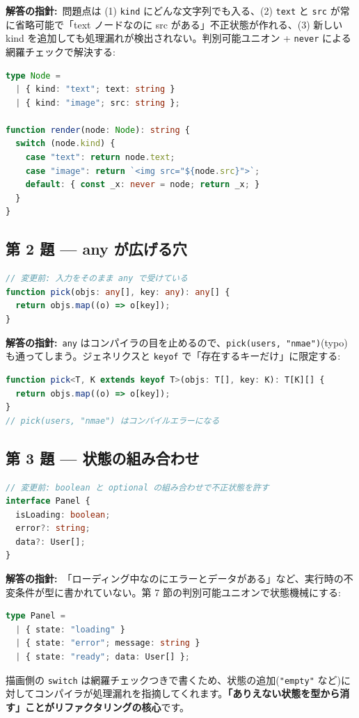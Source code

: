 \documentclass{article}
\begin{document}
\textbf{解答の指針:}\ 問題点は (1) \texttt{kind} にどんな文字列でも入る、(2) \texttt{text} と \texttt{src} が常に省略可能で「text ノードなのに src がある」不正状態が作れる、(3) 新しい kind を追加しても処理漏れが検出されない。判別可能ユニオン + \texttt{never} による網羅チェックで解決する:
\begin{lstlisting}[language=TypeScript]
type Node =
  | { kind: "text"; text: string }
  | { kind: "image"; src: string };

function render(node: Node): string {
  switch (node.kind) {
    case "text": return node.text;
    case "image": return `<img src="${node.src}">`;
    default: { const _x: never = node; return _x; }
  }
}
\end{lstlisting}

\subsection{第 2 題 — any が広げる穴}

\begin{lstlisting}[language=TypeScript]
// 変更前: 入力をそのまま any で受けている
function pick(objs: any[], key: any): any[] {
  return objs.map((o) => o[key]);
}
\end{lstlisting}

\textbf{解答の指針:}\ \texttt{any} はコンパイラの目を止めるので、\texttt{pick(users, "nmae")}(typo)も通ってしまう。ジェネリクスと \texttt{keyof} で「存在するキーだけ」に限定する:
\begin{lstlisting}[language=TypeScript]
function pick<T, K extends keyof T>(objs: T[], key: K): T[K][] {
  return objs.map((o) => o[key]);
}
// pick(users, "nmae") はコンパイルエラーになる
\end{lstlisting}

\subsection{第 3 題 — 状態の組み合わせ}

\begin{lstlisting}[language=TypeScript]
// 変更前: boolean と optional の組み合わせで不正状態を許す
interface Panel {
  isLoading: boolean;
  error?: string;
  data?: User[];
}
\end{lstlisting}

\textbf{解答の指針:}\ 「ローディング中なのにエラーとデータがある」など、実行時の不変条件が型に書かれていない。第 7 節の判別可能ユニオンで状態機械にする:
\begin{lstlisting}[language=TypeScript]
type Panel =
  | { state: "loading" }
  | { state: "error"; message: string }
  | { state: "ready"; data: User[] };
\end{lstlisting}
描画側の \texttt{switch} は網羅チェックつきで書くため、状態の追加(\texttt{"empty"} など)に対してコンパイラが処理漏れを指摘してくれます。\textbf{「ありえない状態を型から消す」ことがリファクタリングの核心}です。
\end{document}
